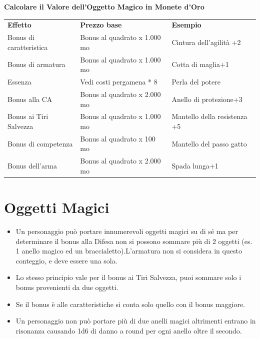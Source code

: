 \documentclass[a4paper,11pt,twoside,openany]{book}
\begin{document}
\bigskip

\textbf{Calcolare il Valore dell'Oggetto Magico in Monete d'Oro}

\begin{tabular}{lll}
	\toprule
	\textbf{Effetto}        & \textbf{Prezzo base}         & \textbf{Esempio}\\
	Bonus di caratteristica & Bonus al quadrato x 1.000 mo & Cintura dell'agilità +2\\
	Bonus di armatura       & Bonus al quadrato x 1.000 mo & Cotta di maglia+1\\
	Essenza                 & Vedi costi pergamena {*} 8   & Perla del potere\\
	Bonus alla CA           & Bonus al quadrato x 2.000 mo & Anello di protezione+3\\
	Bonus ai Tiri Salvezza  & Bonus al quadrato x 1.000 mo & Mantello della resistenza +5\\
	Bonus di competenza     & Bonus al quadrato x 100 mo   & Mantello del passo gatto\\
	Bonus dell'arma         & Bonus al quadrato x 2.000 mo & Spada lunga+1\\
\end{tabular}

\pagebreak

\section{Oggetti Magici}

\label{oggetti-magici}
\begin{itemize}
	\item
	      Un personaggio può portare innumerevoli oggetti magici su di sé ma per determinare il bonus alla Difesa non si possono sommare più di 2 oggetti (es. 1 anello magico ed un braccialetto).L'armatura non si considera in questo conteggio, e deve essere una sola.
	\item
	      Lo stesso principio vale per il bonus ai Tiri Salvezza, puoi sommare solo i bonus provenienti da due oggetti.
	\item
	      Se il bonus è alle caratteristiche si conta solo quello con il bonus maggiore.
	\item
	      Un personaggio non può portare più di due anelli magici altrimenti
	      entrano in risonanza causando 1d6 di danno a round per ogni anello oltre il secondo.
\end{itemize}
\end{document}
